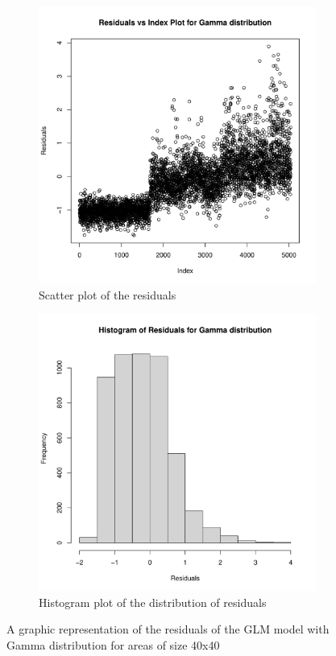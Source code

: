 \documentclass[12pt,a4paper,twoside]{article}
\begin{document}
\begin{figure}[!ht]
    \begin{subfigure}{.45\textwidth}
        \centering
        \includegraphics[width=\linewidth]{img/Gamma_distribution_40x40.pdf}
        \caption{Scatter plot of the residuals}
        \label{fig:gammascatter40}
    \end{subfigure}
    \begin{subfigure}{.45\textwidth}
        \centering
        \includegraphics[width=\linewidth]{img/Gamma_distribution_histogram_40x40.pdf}
        \caption{Histogram plot of the distribution of residuals}
        \label{fig:gammahist40}
    \end{subfigure}
    \caption{A graphic representation of the residuals of the GLM model with Gamma
        distribution for areas of size 40x40}
    \label{fig:gammafig40}
\end{figure}
\end{document}
